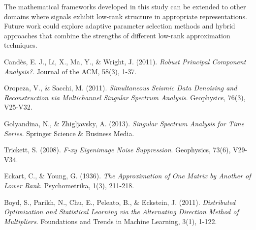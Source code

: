 \documentclass[10pt,twocolumn]{article}
\begin{document}
The mathematical frameworks developed in this study can be extended to other domains where signals exhibit low-rank structure in appropriate representations. Future work could explore adaptive parameter selection methods and hybrid approaches that combine the strengths of different low-rank approximation techniques.

\begin{thebibliography}{9}

Candès, E. J., Li, X., Ma, Y., \& Wright, J. (2011).
\textit{Robust Principal Component Analysis?}.
Journal of the ACM, 58(3), 1-37.

Oropeza, V., \& Sacchi, M. (2011).
\textit{Simultaneous Seismic Data Denoising and Reconstruction via Multichannel Singular Spectrum Analysis}.
Geophysics, 76(3), V25-V32.

Golyandina, N., \& Zhigljavsky, A. (2013).
\textit{Singular Spectrum Analysis for Time Series}.
Springer Science \& Business Media.

Trickett, S. (2008).
\textit{F-xy Eigenimage Noise Suppression}.
Geophysics, 73(6), V29-V34.

Eckart, C., \& Young, G. (1936).
\textit{The Approximation of One Matrix by Another of Lower Rank}.
Psychometrika, 1(3), 211-218.

Boyd, S., Parikh, N., Chu, E., Peleato, B., \& Eckstein, J. (2011).
\textit{Distributed Optimization and Statistical Learning via the Alternating Direction Method of Multipliers}.
Foundations and Trends in Machine Learning, 3(1), 1-122.

\end{thebibliography}
\end{document}
